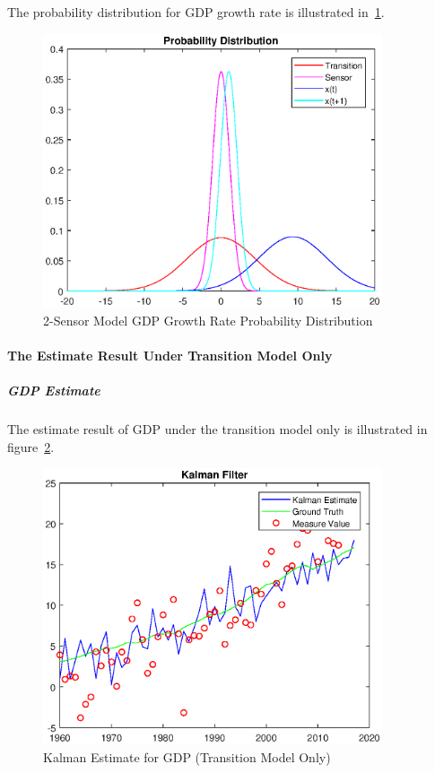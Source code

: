\documentclass[11pt, a4paper]{article}
\begin{document}
The probability distribution for GDP growth rate is illustrated in~\ref{fig:pd_2}.

\begin{figure}[htbp]
	
	\centering 
	\includegraphics[width=10cm]{pd_2}
	
	\caption{2-Sensor Model GDP Growth Rate Probability Distribution}
	\label{fig:pd_2}
	
\end{figure}



\paragraph{The Estimate Result Under Transition Model Only}

\subparagraph{GDP Estimate}

The estimate result of GDP under the transition model only is illustrated in figure~\ref{fig:kf1}.

 \begin{figure}[htbp]
	
	\centering 
	\includegraphics[width=10cm]{kf_1_1}
	
	\caption{Kalman Estimate for GDP (Transition Model Only)}
	\label{fig:kf1}
	
\end{figure}
\end{document}
